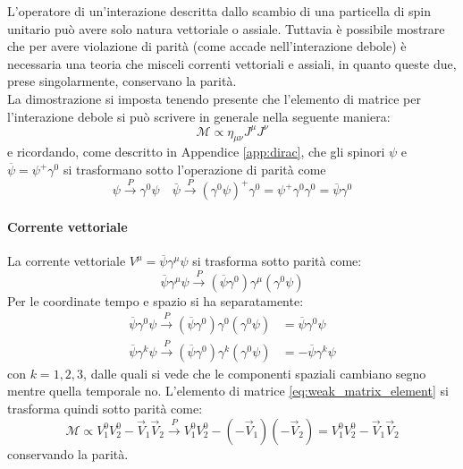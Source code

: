 \documentclass{subnucbo}
\begin{document}
L'operatore di un'interazione descritta dallo scambio di una particella di spin unitario può avere solo natura vettoriale o assiale. Tuttavia è possibile mostrare che per avere violazione di parità (come accade nell'interazione debole) è necessaria una teoria che misceli correnti vettoriali e assiali, in quanto queste due, prese singolarmente, conservano la parità. \\
La dimostrazione si imposta tenendo presente che l'elemento di matrice per l'interazione debole si può scrivere in generale nella seguente maniera:
\begin{equation}
        \mathcal{M} \propto \eta_{\mu\nu}J^{\mu}J^{\nu}
        \label{eq:weak_matrix_element}
\end{equation}
e ricordando, come descritto in Appendice \ref{app:dirac}, che gli spinori $\psi$ e $\overline{\psi} = \psi ^ { + } \gamma ^ { 0 }$ si trasformano sotto l'operazione di parità come
\begin{equation}
        \psi \stackrel { P } { \rightarrow } \gamma ^ { 0 } \psi \quad \overline { \psi } \stackrel { P } { \rightarrow } \left( \gamma ^ { 0 } \psi \right) ^ { + } \gamma ^ { 0 } = \psi ^ { + } \gamma ^ { 0 } \gamma ^ { 0 } = \overline { \psi } \gamma ^ { 0 }
\end{equation}
\paragraph{Corrente vettoriale} La corrente vettoriale $V ^ { \mu } = \overline { \psi } \gamma ^ { \mu } \psi$ si trasforma sotto parità come:
\begin{equation}
        \overline { \psi } \gamma ^ { \mu } \psi \stackrel { P } { \rightarrow } \left( \overline { \psi } \gamma ^ { 0 } \right) \gamma ^ { \mu } \left( \gamma ^ { 0 } \psi \right)
\end{equation}
Per le coordinate tempo e spazio si ha separatamente:
\begin{equation}
        \begin{aligned} \overline { \psi } \gamma ^ { 0 } \psi \stackrel { P } { \rightarrow } \left( \overline { \psi } \gamma ^ { 0 } \right) \gamma ^ { 0 } \left( \gamma ^ { 0 } \psi \right) & = \overline { \psi } \gamma ^ { 0 } \psi \\ \overline { \psi } \gamma ^ { k } \psi \stackrel { P } { \rightarrow } \left( \overline { \psi } \gamma ^ { 0 } \right) \gamma ^ { k } \left( \gamma ^ { 0 } \psi \right) & = - \overline { \psi } \gamma ^ { k } \psi \end{aligned}
\end{equation}
con $k=1,2,3$, dalle quali si vede che le componenti spaziali cambiano segno mentre quella temporale no. L'elemento di matrice \ref{eq:weak_matrix_element} si trasforma quindi sotto parità come:
\begin{equation}
        \mathcal{M} \propto V _ { 1 } ^ { 0 } V _ { 2 } ^ { 0 } - \vec { V } _ { 1 } \vec { V } _ { 2 } \stackrel { P } { \rightarrow } V _ { 1 } ^ { 0 } V _ { 2 } ^ { 0 } - \left( - \vec { V } _ { 1 } \right) \left( - \vec { V } _ { 2 } \right) = V _ { 1 } ^ { 0 } V _ { 2 } ^ { 0 } - \vec { V } _ { 1 } \vec { V } _ { 2 }
\end{equation}
conservando la parità.
\end{document}
